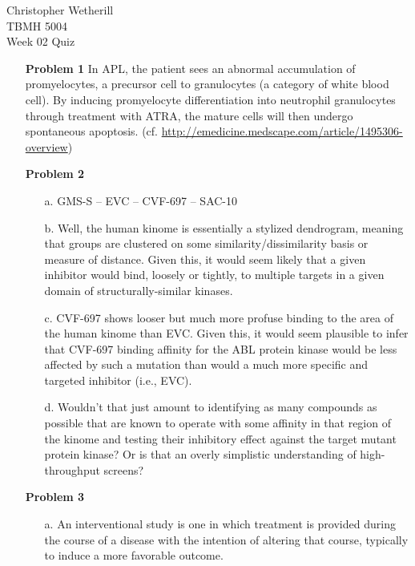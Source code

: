 \documentclass[11pt,final] {article}
\begin{document}
\noindent Christopher Wetherill\\
TBMH 5004\\
Week 02 Quiz\\[0.5cm]

\begin{enumerate}	
	\item[{\bfseries Problem 1}] In APL, the patient sees an abnormal accumulation of promyelocytes, a precursor cell to granulocytes (a category of white blood cell). By inducing promyelocyte differentiation into neutrophil granulocytes through treatment with ATRA, the mature cells will then undergo spontaneous apoptosis. (cf. \url{http://emedicine.medscape.com/article/1495306-overview})
	
	\item[{\bfseries Problem 2}] 
	
	\begin{enumerate}
		\item[a.] GMS-S -- EVC -- CVF-697 -- SAC-10
		
		\item[b.] Well, the human kinome is essentially a stylized dendrogram, meaning that groups are clustered on some similarity/dissimilarity basis or measure of distance. Given this, it would seem likely that a given inhibitor would bind, loosely or tightly, to multiple targets in a given domain of structurally-similar kinases.
		
		\item[c.] CVF-697 shows looser but much more profuse binding to the area of the human kinome than EVC. Given this, it would seem plausible to infer that CVF-697 binding affinity for the ABL protein kinase would be less affected by such a mutation than would a much more specific and targeted inhibitor (i.e., EVC).
		
		\item[d.] Wouldn't that just amount to identifying as many compounds as possible that are known to operate with some affinity in that region of the kinome and testing their inhibitory effect against the target mutant protein kinase? Or is that an overly simplistic understanding of high-throughput screens?
	\end{enumerate}
	
	\item[{\bfseries Problem 3}]
	
	\begin{enumerate}
		\item[a.] An interventional study is one in which treatment is provided during the course of a disease with the intention of altering that course, typically to induce a more favorable outcome.
		

\end{enumerate}
\end{enumerate}
\end{document}
